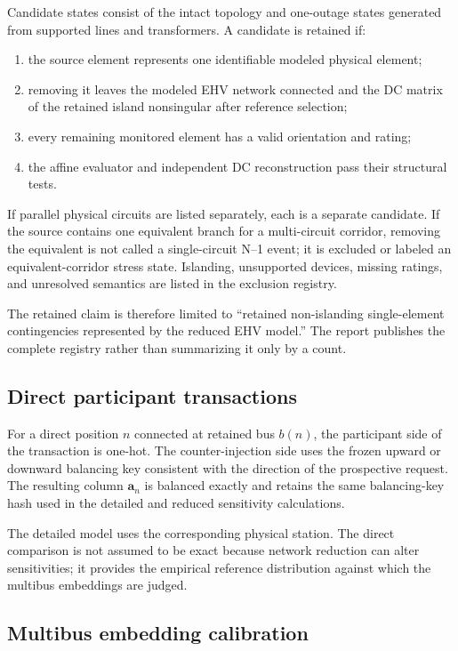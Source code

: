 \documentclass[10pt,journal,onecolumn]{IEEEtran}
\begin{document}
Candidate states consist of the intact topology and one-outage states generated
from supported lines and transformers. A candidate is retained if:
\begin{enumerate}[leftmargin=*,itemsep=2pt]
\item the source element represents one identifiable modeled physical element;
\item removing it leaves the modeled EHV network connected and the DC matrix of
the retained island nonsingular after reference selection;
\item every remaining monitored element has a valid orientation and rating;
\item the affine evaluator and independent DC reconstruction pass their
structural tests.
\end{enumerate}
If parallel physical circuits are listed separately, each is a separate
candidate. If the source contains one equivalent branch for a multi-circuit
corridor, removing the equivalent is not called a single-circuit N--1 event;
it is excluded or labeled an equivalent-corridor stress state. Islanding,
unsupported devices, missing ratings, and unresolved semantics are listed in
the exclusion registry.

The retained claim is therefore limited to ``retained non-islanding
single-element contingencies represented by the reduced EHV model.'' The
report publishes the complete registry rather than summarizing it only by a
count.

\subsection{Direct participant transactions}

For a direct position $n$ connected at retained bus $b(n)$, the participant
side of the transaction is one-hot. The counter-injection side uses the frozen
upward or downward balancing key consistent with the direction of the
prospective request. The resulting column $\bm a_n$ is balanced exactly and
retains the same balancing-key hash used in the detailed and reduced
sensitivity calculations.

The detailed model uses the corresponding physical station. The direct
comparison is not assumed to be exact because network reduction can alter
sensitivities; it provides the empirical reference distribution against which
the multibus embeddings are judged.

\subsection{Multibus embedding calibration}
\end{document}
